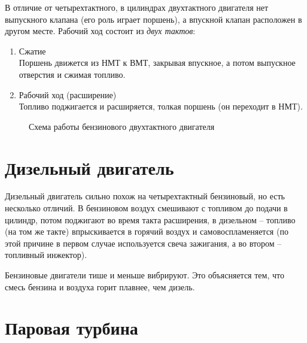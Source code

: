 \documentclass[a4paper,14pt]{article}
\begin{document}
        В отличие от четырехтактного, в цилиндрах двухтактного двигателя нет выпускного клапана (его роль играет поршень), а впускной клапан расположен в другом месте. Рабочий ход состоит из \textit{двух тактов}:
        \begin{enumerate}
            \item Сжатие\\
                Поршень движется из НМТ к ВМТ, закрывая впускное, а потом выпускное отверстия и сжимая топливо.
            \item Рабочий ход (расширение)\\
                Топливо поджигается и расширяется, толкая поршень (он переходит в НМТ).
        \end{enumerate}
        \begin{figure}[h]
            \caption{Схема работы бензинового двухтактного двигателя}
        \end{figure}
    \pagebreak
    \section{Дизельный двигатель}

    Дизельный двигатель сильно похож на четырехтактный бензиновый, но есть несколько отличий. В бензиновом воздух смешивают с топливом до подачи в цилиндр, потом поджигают во время такта расширения, в дизельном -- топливо (на том же такте)  впрыскивается в горячий воздух и самовоспламеняется (по этой причине в первом случае используется свеча зажигания, а во втором -- топливный инжектор).
    
        Бензиновые двигатели тише и меньше вибрируют. Это объясняется тем, что смесь бензина и воздуха горит плавнее, чем дизель.
    \section{Паровая турбина}
        
\end{document}
